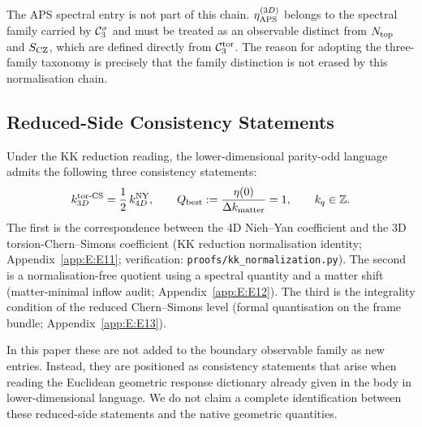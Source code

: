 The APS spectral entry is not part of this chain.  $\eta_{\mathrm{APS}}^{(3D)}$ belongs to the
spectral family carried by $\mathcal{C}_3^{\sigma}$ and must be treated as an observable
distinct from $N_{\mathrm{top}}$ and $S_{\mathrm{CZ}}$, which are defined directly from $\mathcal{C}_3^{\mathrm{tor}}$.
The reason for adopting the three-family taxonomy is precisely that the
family distinction is not erased by this normalisation chain.

\subsection{Reduced-Side Consistency Statements}
\label{app:D:consistency}

Under the KK reduction reading, the lower-dimensional parity-odd language
admits the following three consistency statements:
\begin{equation}
  k_{3D}^{\mathrm{tor\text{-}CS}} = \frac{1}{2}\,k_{4D}^{\mathrm{NY}},
  \qquad
  Q_{\mathrm{best}} := \frac{\eta(0)}{\Delta k_{\mathrm{matter}}} = 1,
  \qquad
  k_q\in\mathbb{Z}.
\end{equation}
The first is the correspondence between the 4D Nieh--Yan coefficient and
the 3D torsion-Chern--Simons coefficient (KK reduction normalisation
identity; Appendix~\ref{app:E:E11}; verification:
\texttt{proofs/kk\_normalization.py}).  The second is a normalisation-free
quotient using a spectral quantity and a matter shift (matter-minimal
inflow audit; Appendix~\ref{app:E:E12}).  The third is the integrality
condition of the reduced Chern--Simons level (formal quantisation on the
frame bundle; Appendix~\ref{app:E:E13}).

In this paper these are not added to the boundary observable family as new
entries.  Instead, they are positioned as consistency statements that arise
when reading the Euclidean geometric response dictionary already given in
the body in lower-dimensional language.  We do not claim a complete
identification between these reduced-side statements and the native
geometric quantities.
